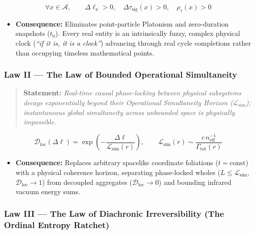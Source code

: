 \documentclass[
]{article}
\providecommand{\tightlist}{%
  \setlength{\itemsep}{0pt}\setlength{\parskip}{0pt}}
\begin{document}
\[\forall x \in \mathcal{A}, \qquad \Delta\ell_x > 0, \quad \Delta\tau_{\mathrm{sig}}(x) > 0, \quad \rho_\tau(x) > 0\]

\begin{itemize}
\tightlist
\item
  \textbf{Consequence:} Eliminates point-particle Platonism and
  zero-duration snapshots (\(t_0\)). Every real entity is an
  intrinsically fuzzy, complex physical clock (\emph{``if it is, it is a
  clock''}) advancing through real cycle completions rather than
  occupying timeless mathematical points.
\end{itemize}

\subsubsection{Law II --- The Law of Bounded Operational
Simultaneity}\label{law-ii-the-law-of-bounded-operational-simultaneity}

\begin{quote}
\textbf{Statement:} \emph{Real-time causal phase-locking between
physical subsystems decays exponentially beyond their Operational
Simultaneity Horizon (\(\mathcal{L}_{\mathrm{sim}}\)); instantaneous
global simultaneity across unbounded space is physically impossible.}
\end{quote}

\[\mathcal{D}_{\mathrm{loc}}(\Delta\ell) = \exp\!\left(-\frac{\Delta\ell}{\mathcal{L}_{\mathrm{sim}}(r)}\right), \qquad \mathcal{L}_{\mathrm{sim}}(r) \sim \frac{c \, n_{\mathrm{eff}}^{-1}}{\Gamma_{\mathrm{tot}}(r)}\]

\begin{itemize}
\tightlist
\item
  \textbf{Consequence:} Replaces arbitrary spacelike coordinate
  foliations (\(t = \text{const}\)) with a physical coherence horizon,
  separating phase-locked wholes (\(L \le \mathcal{L}_{\mathrm{sim}}\),
  \(\mathcal{D}_{\mathrm{loc}} \to 1\)) from decoupled aggregates
  (\(\mathcal{D}_{\mathrm{loc}} \to 0\)) and bounding infrared vacuum
  energy sums.
\end{itemize}

\subsubsection{Law III --- The Law of Diachronic Irreversibility (The
Ordinal Entropy
Ratchet)}\label{law-iii-the-law-of-diachronic-irreversibility-the-ordinal-entropy-ratchet}
\end{document}
